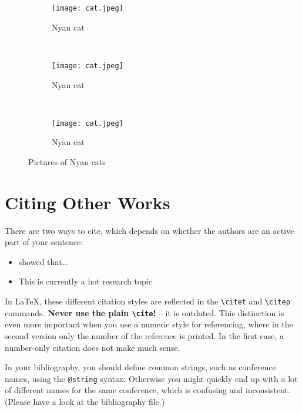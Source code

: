 \documentclass[../{{cookiecutter.project_slug}}.tex]{subfiles}
\begin{document}
    \begin{figure}
        \centering
        \begin{subfigure}[b]{0.3\textwidth}
            \texttt{[image: cat.jpeg]}
            \caption{Nyan cat}
            \label{fig:cat1}
        \end{subfigure}%
        ~ %
        \begin{subfigure}[b]{0.3\textwidth}
            \texttt{[image: cat.jpeg]}
            \caption{Nyan cat}
            \label{fig:cat2} 
        \end{subfigure}
        ~ %
        \begin{subfigure}[b]{0.3\textwidth}
            \texttt{[image: cat.jpeg]}
            \caption{Nyan cat}
            \label{fig:cat3}  
        \end{subfigure}
        \caption[Nyan cats]{Pictures of Nyan cats}\label{fig:cats}
    \end{figure}



    \section{Citing Other Works}
    There are two ways to cite, which depends on whether the authors are an
    active part of your sentence:
    \begin{itemize}[noitemsep]
        \item \citet{muster} showed that\ldots{}
        \item This is currently a hot research topic \citep{muster}
    \end{itemize}
    In  \LaTeX{}, these  different  citation styles  are  reflected in  the
    \texttt{\textbackslash citet}  and  \texttt{\textbackslash citep}  commands. \textbf{Never  use  the  plain
    \texttt{\textbackslash cite}!} -- it is outdated.
    This distinction  is even more important  when you use a  numeric style
    for referencing, where in the second version only the number of the 
    reference is printed.   In the first case, a  number-only citation does
    not make much sense.

    In  your  bibliography, you  should  define  common strings,  such  as 
    conference  names, using  the  \verb|@string|  syntax.  Otherwise  you 
    might  quickly end  up with  a  lot of  different names  for the  same 
    conference, which is confusing and  inconsistent.  (Please have a look 
    at the bibliography file.)                                             
\end{document}
